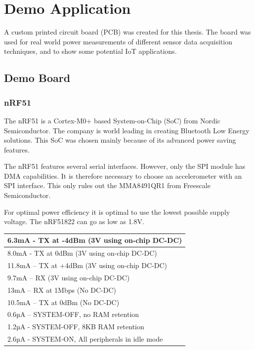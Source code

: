 \chapter{Demo Application}

A custom printed circuit board (PCB) was created for this thesis. The board was used for real world power measurements of different sensor data acquisition techniques, and to show some potential IoT applications. 

\section{Demo Board}

\subsection{nRF51}

The nRF51 is a Cortex-M0+ based System-on-Chip (SoC) from Nordic Semiconductor. The company is world leading in creating Bluetooth Low Energy solutions. This SoC was chosen mainly because of its advanced power saving features. 

The nRF51 features several serial interfaces. However, only the SPI module has DMA capabilities. It is therefore necessary to choose an accelerometer with an SPI interface. This only rules out the MMA8491QR1 from Freescale Semiconductor.

For optimal power efficiency it is optimal to use the lowest possible supply voltage. The nRF51822 can go as low as 1.8V.

\begin{center}
    \begin{tabular}{| l |}
    \hline
    6.3mA - TX at -4dBm (3V using on-chip DC-DC) \\ \hline
    8.0mA - TX at 0dBm (3V using on-chip DC-DC) \\ \hline
    11.8mA – TX at +4dBm (3V using on-chip DC-DC) \\ \hline
    9.7mA – RX (3V using on-chip DC-DC) \\ \hline
    13mA – RX at 1Mbps (No DC-DC) \\ \hline
    10.5mA – TX at 0dBm (No DC-DC) \\ \hline
    0.6µA – SYSTEM-OFF, no RAM retention \\ \hline
    1.2µA - SYSTEM-OFF, 8KB RAM retention \\ \hline
    2.6µA - SYSTEM-ON, All peripherals in idle mode \\ \hline
    \end{tabular}
\end{center}

